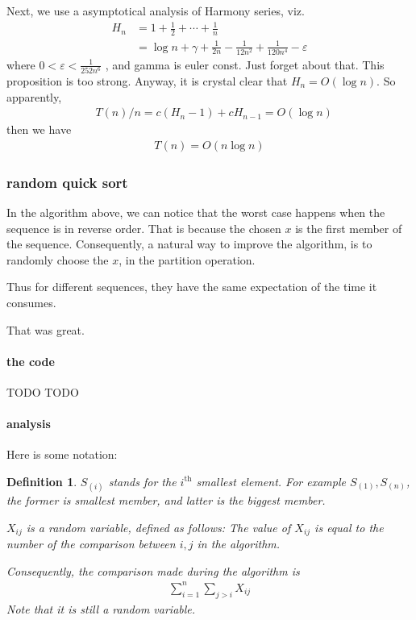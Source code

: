 \documentclass[a4paper, 10pt]{ctexart} %
\newtheorem{definition}{Definition}
\begin{document}
Next, we use a asymptotical analysis of Harmony series, viz.
\begin{align*}
    H_{n} & = 1 + \frac{1}{2} + \cdots + \frac{1}{n} \\
    & = \log n + \gamma + \frac{1}{2n}  -\frac{1}{12n ^{2} } + \frac{1}{120 n^{4} } - \varepsilon
\end{align*}
where $ 0 < \varepsilon < \frac{1}{252n ^{6} } $ , and gamma is euler const. Just forget about that. This proposition is too strong. Anyway, it is crystal clear that $H_{n} =  O \left(\log n\right)$. So apparently, 
\begin{align*}
    & T\left(n\right) / n  = c \left(H _{n} - 1\right)  + c H_{n-1}  = O\left(\log n\right)
\end{align*}
then we have 
\begin{align*}
T(n) = O\left(n \log n\right)
\end{align*}

\subsubsection{random quick sort}
In the algorithm above, we can notice that the worst case happens when the sequence 
is in reverse order. That is because the chosen $x$ is the first member of the sequence. 
Consequently, a natural way to improve the algorithm, is to randomly choose the $x$, in the
partition operation.

Thus for different sequences, they have the same expectation of the time it consumes.

That was great. 

\paragraph{the code} %
\label{par:the code} TODO TODO

\paragraph{analysis} %
\label{par:analysis}

Here is some notation: 
\begin{definition}
    $S_{\left(i\right)}$ stands for the $i^{\text{th}}$ smallest element. For example $S_{\left(1\right)}, S_{\left(n\right)}$, the former is smallest member, and latter is the biggest member. 

    $X_{ij}$ is a random variable, defined as follows: 
    The value of $X_{ij}$   
    is equal to the number of the comparison between $i , j$ 
    in the algorithm. 

    Consequently, the comparison made during the algorithm is 
    \begin{align*}
        \sum_{i  =1}  ^{n} \sum_{j > i}  X_{ij}
    \end{align*}
    Note that it is still a random variable.
\end{definition}
\end{document}
